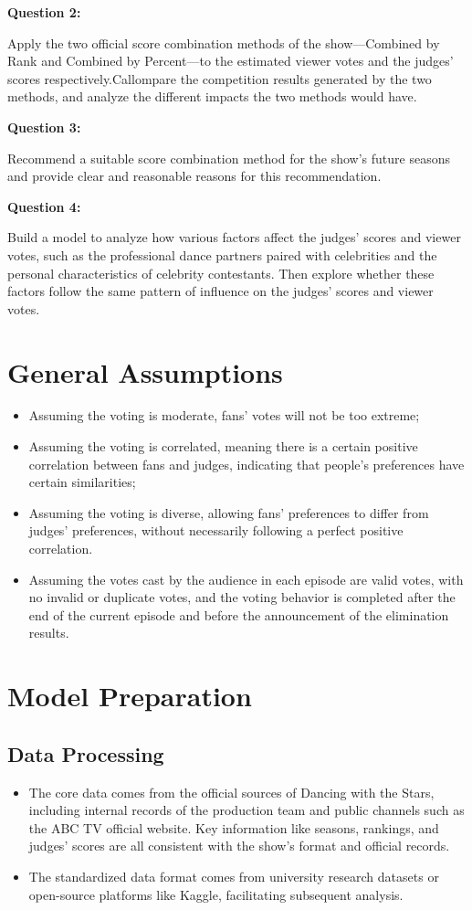 \documentclass{mcmthesis}
\begin{document}
{\large\bfseries Question 2:}\par
Apply the two official score combination methods of the show—Combined by Rank and Combined by Percent—to the estimated viewer votes and the judges’ scores respectively.Callompare the competition results generated by the two methods, and analyze the different impacts the two methods would have.

{\large\bfseries Question 3:}\par
Recommend a suitable score combination method for the show’s future seasons and provide clear and reasonable reasons for this recommendation.

{\large\bfseries Question 4:}\par
Build a model to analyze how various factors affect the judges’ scores and viewer votes, such as the professional dance partners paired with celebrities and the personal characteristics of celebrity contestants. Then explore whether these factors follow the same pattern of influence on the judges’ scores and viewer votes.

\section{General Assumptions}
\begin{itemize}
\item Assuming the voting is moderate, fans' votes will not be too extreme;
\item Assuming the voting is correlated, meaning there is a certain positive correlation between fans and judges, indicating that people's preferences have certain similarities; 
\item Assuming the voting is diverse, allowing fans' preferences to differ from judges' preferences, without necessarily following a perfect positive correlation.
\item Assuming the votes cast by the audience in each episode are valid votes, with no invalid or duplicate votes, and the voting behavior is completed after the end of the current episode and before the announcement of the elimination results.
\end{itemize}
\par

\section{Model Preparation}
\subsection{Data Processing}
\begin{itemize}
\item The core data comes from the official sources of Dancing with the Stars, including internal records of the production team and public channels such as the ABC TV official website. Key information like seasons, rankings, and judges' scores are all consistent with the show's format and official records.
\item The standardized data format comes from university research datasets or open-source platforms like Kaggle, facilitating subsequent analysis.
\end{itemize}
\end{document}
